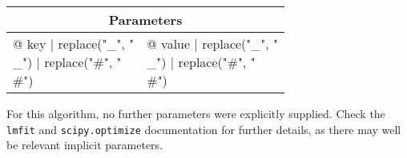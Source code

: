 \vspace*{1ex}
\begin{tabular}{ll}
\toprule
\multicolumn{2}{c}{\textbf{Parameters}}
\\
\midrule
{@ key | replace("_", "\\_") | replace("#", "\\#") } & {@ value | replace("_", "\\_") | replace("#", "\\#") }
\\
\bottomrule
\end{tabular}
\vspace*{1ex}
For this algorithm, no further parameters were explicitly supplied. Check the \texttt{lmfit} and \texttt{scipy.optimize} documentation for further details, as there may well be relevant implicit parameters.

